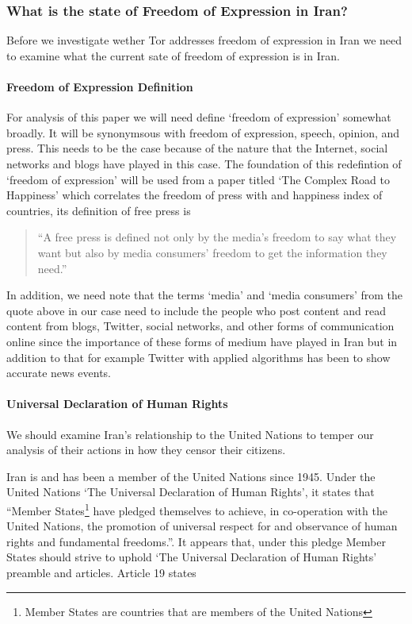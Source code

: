 \documentclass[11pt]{article}
\begin{document}
\begin{multicols}{2}
\subsubsection{What is the state of Freedom of Expression in Iran?}
Before we investigate wether Tor addresses freedom of expression in Iran we need
to examine what the current sate of freedom of expression is in Iran. 

\paragraph{Freedom of Expression Definition}

For analysis of this paper we will need define `freedom of expression' somewhat
broadly. It will be synonymsous with freedom of expression, speech, opinion, and
press.  This needs to be the case because of the nature that the Internet,
social networks and blogs have played in this case. The foundation of this
redefintion of `freedom of expression' will be used from a paper titled `The
Complex Road to Happiness' which correlates the freedom of press with and
happiness index of countries, its definition of free press is 
\begin{quotation} 
  ``A free press is defined not only by the media's freedom to say what they want
  but also by media consumers' freedom to get the information they need.''\cite{
  PublicAttitudeTowardFreedomPress, ComplexRoadToHappiness}
\end{quotation}
In addition, we need note that the terms `media' and `media consumers' from the
quote above in our case need to include the people who post content and read
content from blogs, Twitter, social networks, and other forms of communication
online since the importance of these forms of medium have played in Iran but in
addition to that for example Twitter with applied algorithms has been to show
accurate news events.  \cite{Twitter:BreakingNewsDetection,
Twitter:IdentificationLiveEvents, Twitter:MeasuringInfluence}

\paragraph{Universal Declaration of Human Rights}

We should examine Iran's relationship to the United Nations to temper our
analysis of their actions in how they censor their citizens. 

Iran is and has been a member of the United Nations since 1945.
\cite{UN:IranBecameMember, UN:IranActiveMember} Under the United Nations `The
Universal Declaration of Human Rights', it states that ``Member States\footnote{Member 
States are countries that are members of the United Nations}
have pledged themselves to achieve, in co-operation with the United Nations, the
promotion of universal respect for and observance of human rights and
fundamental freedoms.''\cite{UniversalDeclerationOfHumanRights}. It appears
that, under this pledge Member States should strive to uphold `The Universal
Declaration of Human Rights' preamble and articles. Article 19 states


\end{multicols}
\end{document}
